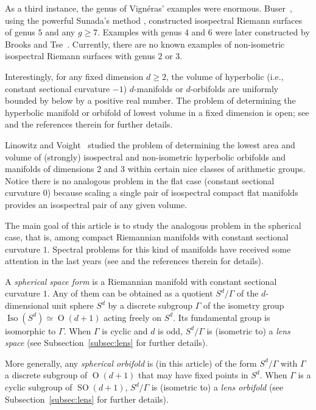\documentclass[12pt,a4paper,final]{amsart}
\theoremstyle{plain}
\theoremstyle{definition}
\theoremstyle{remark}
\numberwithin{equation}{section}
\DeclareMathOperator{\Ot}{O}
\DeclareMathOperator{\SO}{SO}
\newcommand{\op}{\operatorname}
\begin{document}
As a third instance, the genus of Vign\'{e}ras' examples were enormous. 
Buser~\cite{Buser-book}, using the powerful Sunada's method \cite{Sunada85}, constructed isospectral  Riemann surfaces of genus $5$ and any $g\geq7$. 
Examples with genus $4$ and $6$ were later constructed by Brooks and Tse~\cite{BrooksTse87}. 
Currently, there are no known examples of non-isometric isospectral Riemann surfaces with genus $2$ or $3$. 





Interestingly, for any fixed dimension $d\geq2$, the volume of hyperbolic (i.e., constant sectional curvature $-1$) $d$-manifolds or $d$-orbifolds are uniformly bounded by below by a positive real number. 
The problem of determining the hyperbolic manifold or orbifold of lowest volume in a fixed dimension is open; see \cite{BelolipetskyICM} and the references therein for further details. 

Linowitz and Voight~\cite{LinowitzVoight15} studied the problem of determining the lowest area and volume of (strongly) isospectral and non-isometric hyperbolic orbifolds and manifolds of dimensions 2 and 3 within certain nice classes of arithmetic groups. 
Notice there is no analogous problem in the flat case (constant sectional curvature $0$) because scaling a single pair of isospectral compact flat manifolds provides an isospectral pair of any given volume. 

The main goal of this article is to study the analogous problem in the spherical case, that is, among compact Riemannian manifolds with constant sectional curvature $1$. 
Spectral problems for this kind of manifolds have received some attention in the last years (see \cite{LMR-SaoPaulo} and the references therein for details). 

A \emph{spherical space form} is a Riemannian manifold with constant sectional curvature $1$. 
Any of them can be obtained as a quotient $S^d/\Gamma$ of the $d$-dimensional unit sphere $S^d$ by a discrete subgroup $\Gamma$ of the isometry group $\op{Iso}(S^d)\simeq\Ot(d+1)$ acting freely on $S^d$. 
Its fundamental group is isomorphic to $\Gamma$. 
When $\Gamma$ is cyclic and $d$ is odd, $S^d/\Gamma$ is (isometric to) a \emph{lens space} (see Subsection~\ref{subsec:lens} for further details). 

More generally, any \emph{spherical orbifold} is (in this article) of the form $S^d/\Gamma$ with $\Gamma$ a discrete subgroup of $\Ot(d+1)$ that may have fixed points in $S^d$. 
When $\Gamma$ is a cyclic subgroup of $\SO(d+1)$, $S^d/\Gamma$ is (isometric to) a \emph{lens orbifold} (see Subsection~\ref{subsec:lens} for further details). 
\end{document}
